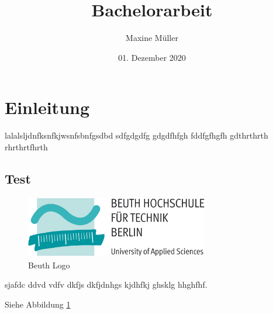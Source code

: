 \documentclass[a4paper,12pt]{scrartcl}
\title{Bachelorarbeit}
\author{Maxine Müller}
\date{01. Dezember 2020}
\begin{document}
    
\maketitle
\tableofcontents
\newpage



\section{Einleitung}
 lalalsljdnfksnfkjwsnfsbnfgsdbd
sdfgdgdfg gdgdfhfgh fddfgfhgfh gdthrthrth rhrthrtfhrth 
\subsection{Test}

\begin{figure}[h]
    \begin{center}
        \includegraphics[width=8cm]{pics/Beuth_logo.png}
        \caption{Beuth Logo}
        \label{beuth_logo}
    \end{center}
\end{figure}
sjafdc ddvd vdfv dkfjs dkfjdnhgs  kjdhfkj ghsklg hhghfhf. \cite{Testing}
\par Siehe Abbildung \ref{beuth_logo}





\newpage

\end{document}
